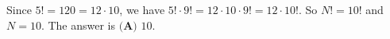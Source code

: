 Since $5!=120=12\cdot10$, we have $5!\cdot9!=12\cdot10\cdot9!=12\cdot10!$. So $N!=10!$ and $N=10$. The answer is $\boxed{\textbf{(A) }10}$.
